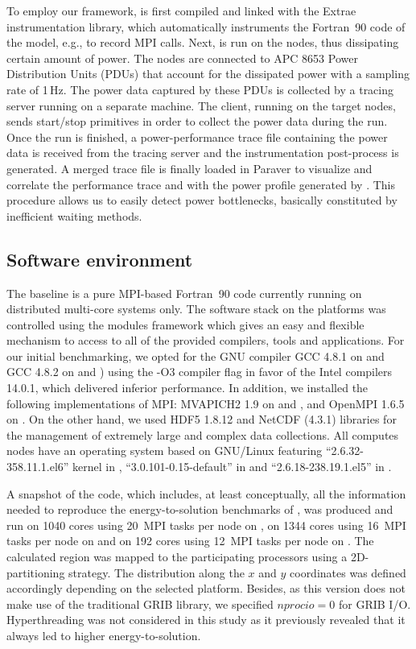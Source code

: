 To employ our  framework, \cosmoart is first compiled  and linked with
the  Extrae instrumentation  library, which  automatically instruments
the Fortran~90  code of the model,  e.g., to record  MPI calls.  Next,
\cosmoart  is run  on the  nodes, thus  dissipating certain  amount of
power. The  nodes are connected  to APC 8653 Power  Distribution Units
(PDUs) that account  for the dissipated power with  a sampling rate of
1\,Hz. The power data captured by  these PDUs is collected by a \pmlib
tracing server running  on a separate machine. The  client, running on
the target nodes, sends start/stop  primitives in order to collect the
power  data during  the \cosmoart  run. Once  the run  is  finished, a
power-performance  trace file  containing the  power data  is received
from  the  tracing  server  and the  instrumentation  post-process  is
generated.  A  merged trace  file  is  finally  loaded in  Paraver  to
visualize  and correlate  the  performance trace  and  with the  power
profile  generated by \cosmoart.  This procedure  allows us  to easily
detect power bottlenecks, basically constituted by inefficient waiting
methods.

\subsection{Software environment}
\label{subsec:3.2}

The \cosmoart  baseline is a pure MPI-based  Fortran~90 code currently
running on distributed multi-core systems only.  The software stack on
the platforms  was controlled using the modules  framework which gives
an  easy and  flexible  mechanism to  access  to all  of the  provided
compilers, tools  and applications.  For our  initial benchmarking, we
opted for the GNU compiler GCC 4.8.1 on \monch and GCC 4.8.2 on \pilat
and  \tinto)  using  the -O3  compiler  flag  in  favor of  the  Intel
compilers 14.0.1, which  delivered inferior performance.  In addition,
we  installed the following  implementations of  MPI: MVAPICH2  1.9 on
\monch and \pilat, and OpenMPI 1.6.5  on \tinto. On the other hand, we
used HDF5  1.8.12 and NetCDF  (4.3.1) libraries for the  management of
extremely large and complex data collections.  All computes nodes have
an     operating    system     based     on    GNU/Linux     featuring
``2.6.32-358.11.1.el6'' kernel  in \monch, ``3.0.101-0.15-default'' in
\pilat and ``2.6.18-238.19.1.el5'' in \tinto.

A snapshot of the code, which includes, at least conceptually, all the
information needed  to reproduce the  energy-to-solution benchmarks of
\cosmoart, was produced  and run on 1040 cores  using 20~MPI tasks per
node on  \monch, on 1344 cores  using 16~MPI tasks per  node on \pilat
and  on  192  cores  using  12~MPI  tasks per  node  on  \tinto.   The
calculated region  was mapped to the participating  processors using a
2D-partitioning  strategy.  The  distribution  along the  $x$ and  $y$
coordinates  was   defined  accordingly  depending   on  the  selected
platform.  Besides,  as  this  version   does  not  make  use  of  the
traditional  GRIB  library, we  specified  $nprocio=0$  for GRIB  I/O.
Hyperthreading  was not  considered  in this  study  as it  previously
revealed that it always led to higher energy-to-solution.
